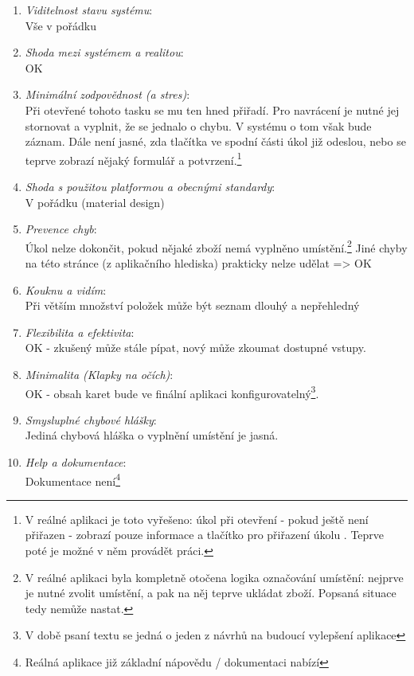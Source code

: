 \begin{enumerate}
  \item \emph{Viditelnost stavu systému}:\\Vše v pořádku
  \item \emph{Shoda mezi systémem a realitou}:\\OK
  \item \emph{Minimální zodpovědnost (a stres)}:\\Při otevřené tohoto tasku se mu ten hned přiřadí. Pro navrácení je nutné jej stornovat a vyplnit, že se jednalo o chybu. V systému o tom však bude záznam. Dále není jasné, zda tlačítka ve spodní části úkol již odeslou, nebo se teprve zobrazí nějaký formulář a potvrzení.\footnote{V reálné aplikaci je toto vyřešeno: úkol při otevření - pokud ještě není přiřazen - zobrazí pouze informace a tlačítko pro přiřazení úkolu . Teprve poté je možné v něm provádět práci.}
  \item \emph{Shoda s použitou platformou a obecnými standardy}:\\V pořádku (material design)
  \item \emph{Prevence chyb}:\\Úkol nelze dokončit, pokud nějaké zboží nemá vyplněno umístění.\footnote{V reálné aplikaci byla kompletně otočena logika označování umístění: nejprve je nutné zvolit umístění, a pak na něj teprve ukládat zboží. Popsaná situace tedy nemůže nastat.} Jiné chyby na této stránce (z aplikačního hlediska) prakticky nelze udělat => OK
  \item \emph{Kouknu a vidím}:\\Při větším množství položek může být seznam dlouhý a nepřehledný
  \item \emph{Flexibilita a efektivita}:\\OK - zkušený může stále pípat, nový může zkoumat dostupné vstupy.
  \item \emph{Minimalita (Klapky na očích)}:\\OK - obsah karet bude ve finální aplikaci konfigurovatelný\footnote{V době psaní textu se jedná o jeden z návrhů na budoucí vylepšení aplikace}.
  \item \emph{Smysluplné chybové hlášky}:\\Jediná chybová hláška o vyplnění umístění je jasná.
  \item \emph{Help a dokumentace}:\\Dokumentace není\footnote{Reálná aplikace již základní nápovědu / dokumentaci nabízí}
\end{enumerate}

